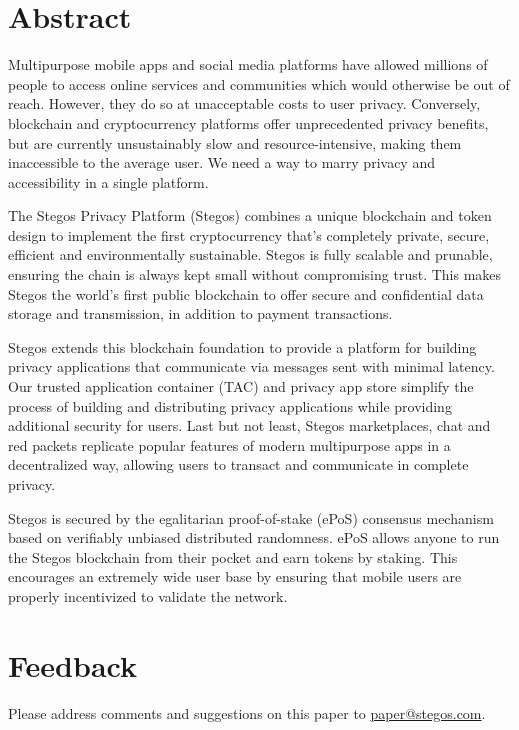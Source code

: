 \documentclass[8pt,fleqn,openany]{book}
\begin{document}
\newpage

\tableofcontents\newpage

\section{Abstract}
Multipurpose mobile apps and social media platforms have allowed millions of people to access online services and communities which would otherwise be out of reach. However, they do so at unacceptable costs to user privacy. Conversely, blockchain and cryptocurrency platforms offer unprecedented privacy benefits, but are currently unsustainably slow and resource-intensive, making them inaccessible to the average user. We need a way to marry privacy and accessibility in a single platform.

The Stegos Privacy Platform (Stegos) combines a unique blockchain and token design to implement the first cryptocurrency that’s completely private, secure, efficient and environmentally sustainable. Stegos is fully scalable and prunable, ensuring the chain is always kept small without compromising trust. This makes Stegos the world’s first public blockchain to offer secure and confidential data storage and transmission, in addition to payment transactions. 

Stegos extends this blockchain foundation to provide a platform for building privacy applications that communicate via messages sent with minimal latency. Our trusted application container (TAC) and privacy app store simplify the process of building and distributing privacy applications while providing additional security for users. Last but not least, Stegos marketplaces, chat and red packets replicate popular features of modern multipurpose apps in a decentralized way, allowing users to transact and communicate in complete privacy.

Stegos is secured by the egalitarian proof-of-stake (ePoS) consensus mechanism based on verifiably unbiased distributed randomness. ePoS allows anyone to run the Stegos blockchain from their pocket and earn tokens by staking. This encourages an extremely wide user base by ensuring that mobile users are properly incentivized to validate the network.
\section{Feedback}

Please address comments and suggestions on this paper to \href{mailto:paper@stegos.com}{paper@stegos.com}.
\end{document}
